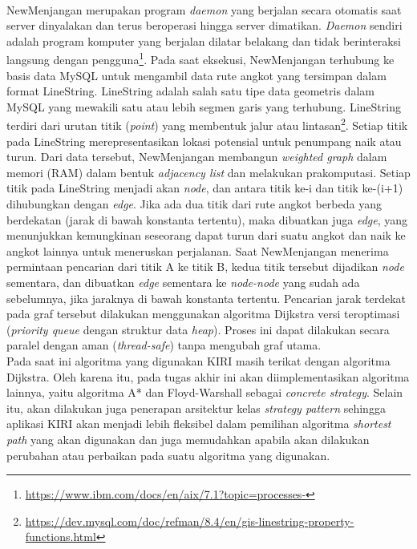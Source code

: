 \\
NewMenjangan merupakan program \textit{daemon} yang berjalan secara otomatis saat server dinyalakan dan terus beroperasi hingga server dimatikan. \textit{Daemon} sendiri adalah program komputer yang berjalan dilatar belakang dan tidak berinteraksi langsung dengan pengguna\footnote{\url{https://www.ibm.com/docs/en/aix/7.1?topic=processes-}}. Pada saat eksekusi, NewMenjangan terhubung ke basis data MySQL untuk mengambil data rute angkot yang tersimpan dalam format LineString. LineString adalah salah satu tipe data geometris dalam MySQL yang mewakili satu atau lebih segmen garis yang terhubung. LineString terdiri dari urutan titik (\textit{point}) yang membentuk jalur atau lintasan\footnote{\url{https://dev.mysql.com/doc/refman/8.4/en/gis-linestring-property-functions.html}}. Setiap titik pada LineString merepresentasikan lokasi potensial untuk penumpang naik atau turun. Dari data tersebut, NewMenjangan membangun \textit{weighted graph} dalam memori (RAM) dalam bentuk \textit{adjacency list} dan melakukan prakomputasi. Setiap titik pada LineString menjadi akan \textit{node}, dan antara titik ke-i dan titik ke-(i+1) dihubungkan dengan \textit{edge}. Jika ada dua titik dari rute angkot berbeda yang berdekatan (jarak di bawah konstanta tertentu), maka dibuatkan juga \textit{edge}, yang menunjukkan kemungkinan seseorang dapat turun dari suatu angkot dan naik ke angkot lainnya untuk meneruskan perjalanan. 
\newpage
\noindent
Saat NewMenjangan menerima permintaan pencarian dari titik A ke titik B, kedua titik tersebut dijadikan \textit{node} sementara, dan dibuatkan \textit{edge} sementara ke \textit{node-node} yang sudah ada sebelumnya, jika jaraknya di bawah konstanta tertentu. Pencarian jarak terdekat pada graf tersebut dilakukan menggunakan algoritma Dijkstra versi teroptimasi (\textit{priority queue} dengan struktur data \textit{heap}). Proses ini dapat dilakukan secara paralel dengan aman (\textit{thread-safe}) tanpa mengubah graf utama.
\\
Pada saat ini algoritma yang digunakan KIRI masih terikat dengan algoritma Dijkstra. Oleh karena itu, pada tugas akhir ini akan diimplementasikan algoritma lainnya, yaitu algoritma A* dan Floyd-Warshall sebagai \textit{concrete strategy}. Selain itu, akan dilakukan juga penerapan arsitektur kelas \textit{strategy pattern} sehingga aplikasi KIRI akan menjadi lebih fleksibel dalam pemilihan algoritma \textit{shortest path} yang akan digunakan dan juga memudahkan apabila akan dilakukan perubahan atau perbaikan pada suatu algoritma yang digunakan.

